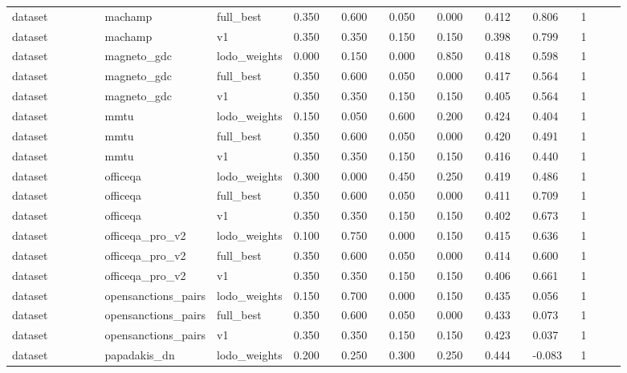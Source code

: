 \begin{landscape}
\begin{longtable}{p{0.162\linewidth}p{0.081\linewidth}p{0.081\linewidth}p{0.081\linewidth}p{0.081\linewidth}p{0.081\linewidth}p{0.081\linewidth}p{0.081\linewidth}p{0.081\linewidth}p{0.081\linewidth}}
dataset & machamp & full\_\allowbreak{}best & 0.350 & 0.600 & 0.050 & 0.000 & 0.412 & 0.806 & 1 \\
dataset & machamp & v1 & 0.350 & 0.350 & 0.150 & 0.150 & 0.398 & 0.799 & 1 \\
dataset & magneto\_\allowbreak{}gdc & lodo\_\allowbreak{}weights & 0.000 & 0.150 & 0.000 & 0.850 & 0.418 & 0.598 & 1 \\
dataset & magneto\_\allowbreak{}gdc & full\_\allowbreak{}best & 0.350 & 0.600 & 0.050 & 0.000 & 0.417 & 0.564 & 1 \\
dataset & magneto\_\allowbreak{}gdc & v1 & 0.350 & 0.350 & 0.150 & 0.150 & 0.405 & 0.564 & 1 \\
dataset & mmtu & lodo\_\allowbreak{}weights & 0.150 & 0.050 & 0.600 & 0.200 & 0.424 & 0.404 & 1 \\
dataset & mmtu & full\_\allowbreak{}best & 0.350 & 0.600 & 0.050 & 0.000 & 0.420 & 0.491 & 1 \\
dataset & mmtu & v1 & 0.350 & 0.350 & 0.150 & 0.150 & 0.416 & 0.440 & 1 \\
dataset & officeqa & lodo\_\allowbreak{}weights & 0.300 & 0.000 & 0.450 & 0.250 & 0.419 & 0.486 & 1 \\
dataset & officeqa & full\_\allowbreak{}best & 0.350 & 0.600 & 0.050 & 0.000 & 0.411 & 0.709 & 1 \\
dataset & officeqa & v1 & 0.350 & 0.350 & 0.150 & 0.150 & 0.402 & 0.673 & 1 \\
dataset & officeqa\_\allowbreak{}pro\_\allowbreak{}v2 & lodo\_\allowbreak{}weights & 0.100 & 0.750 & 0.000 & 0.150 & 0.415 & 0.636 & 1 \\
dataset & officeqa\_\allowbreak{}pro\_\allowbreak{}v2 & full\_\allowbreak{}best & 0.350 & 0.600 & 0.050 & 0.000 & 0.414 & 0.600 & 1 \\
dataset & officeqa\_\allowbreak{}pro\_\allowbreak{}v2 & v1 & 0.350 & 0.350 & 0.150 & 0.150 & 0.406 & 0.661 & 1 \\
dataset & opensanctions\_\allowbreak{}pairs & lodo\_\allowbreak{}weights & 0.150 & 0.700 & 0.000 & 0.150 & 0.435 & 0.056 & 1 \\
dataset & opensanctions\_\allowbreak{}pairs & full\_\allowbreak{}best & 0.350 & 0.600 & 0.050 & 0.000 & 0.433 & 0.073 & 1 \\
dataset & opensanctions\_\allowbreak{}pairs & v1 & 0.350 & 0.350 & 0.150 & 0.150 & 0.423 & 0.037 & 1 \\
dataset & papadakis\_\allowbreak{}dn & lodo\_\allowbreak{}weights & 0.200 & 0.250 & 0.300 & 0.250 & 0.444 & -0.083 & 1 \\

\end{longtable}
\end{landscape}
